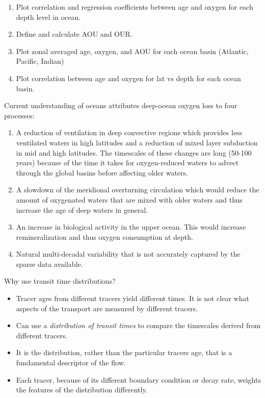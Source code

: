 \documentclass[article,12pt]{article}
\begin{document}
\begin{enumerate}
  \item Plot correlation and regression coefficients between age and oxygen for
  each depth level in ocean.
  \item Define and calculate AOU and OUR.
  \item Plot zonal averaged age, oxygen, and AOU for each ocean basin (Atlantic,
  Pacific, Indian)
  \item Plot correlation between age and oxygen for lat vs depth for each ocean basin.
\end{enumerate}


Current understanding of oceans attributes deep-ocean oxygen loss to four processes:
\begin{enumerate}
  \item A reduction of ventilation in deep convective regions which provides less
  ventilated waters in high latitudes and a reduction of mixed layer subduction in
  mid and high latitudes. The timescales of these changes are long (50-100 years) because
  of the time it takes for oxygen-reduced waters to advect through the global basins
  before affecting older waters.
  \item A slowdown of the meridional overturning circulation which would reduce the amount
  of oxygenated waters that are mixed with older waters and thus increase the age
  of deep waters in general.
  \item An increase in biological activity in the upper ocean. This would increase
  remineralization and thus oxygen consumption at depth.
  \item Natural multi-decadal variability that is not accurately captured by the
  sparse data available.
\end{enumerate}


Why use transit time distributions?
\begin{itemize}
  \item Tracer ages from different tracers yield different times. It is not clear
  what aspects of the transport are measured by different tracers.
  \item Can use a \textit{distribution of transit times} to compare the timescales
  derived from different tracers.
  \item It is the distribution, rather than the particular tracers age, that is a
  fundamental descriptor of the flow.
  \item Each tracer, because of its different boundary condition or decay rate,
  weights the features of the distribution differently.

\end{itemize}
\end{document}
